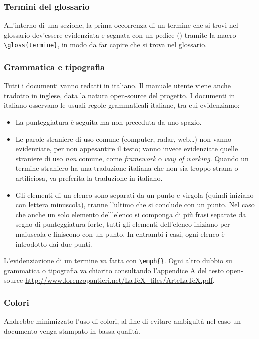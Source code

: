\begin{itemize}
\subsubsection{Termini del glossario} All'interno di una sezione, la prima occorrenza di un termine che si trovi nel glossario dev'essere evidenziata e segnata con un pedice () tramite la macro \texttt{\textbackslash gloss\{termine\}}, in modo da far capire che si trova nel glossario.

\subsubsection{Grammatica e tipografia} Tutti i documenti vanno redatti in italiano. Il manuale utente viene anche tradotto in inglese, data la natura open-source del progetto. I documenti in italiano osservano le usuali regole grammaticali italiane, tra cui evidenziamo:
\begin{itemize}
	\item La punteggiatura è seguita ma non preceduta da uno spazio.
	\item Le parole straniere di uso comune (computer, radar, web\dots) non vanno evidenziate, per non appesantire il testo; vanno invece evidenziate quelle straniere di uso \emph{non} comune, come \emph{framework} o \emph{way of working}. Quando un termine straniero ha una traduzione italiana che non sia troppo strana o artificiosa, va preferita la traduzione in italiano.
	\item Gli elementi di un elenco sono separati da un punto e virgola (quindi iniziano con lettera minuscola), tranne l'ultimo che si conclude con un punto. Nel caso che anche un solo elemento dell'elenco si componga di più frasi separate da segno di punteggiatura forte, tutti gli elementi dell'elenco iniziano per maiuscola e finiscono con un punto. In entrambi i casi, ogni elenco è introdotto dai due punti.
\end{itemize}
L'evidenziazione di un termine va fatta con \texttt{\textbackslash emph\{\}}. Ogni altro dubbio su grammatica o tipografia va chiarito consultando l'appendice A del testo open-source \url{http://www.lorenzopantieri.net/LaTeX_files/ArteLaTeX.pdf}.

\subsubsection{Colori} Andrebbe minimizzato l'uso di colori, al fine di evitare ambiguità nel caso un documento venga stampato in bassa qualità.


\end{itemize}
